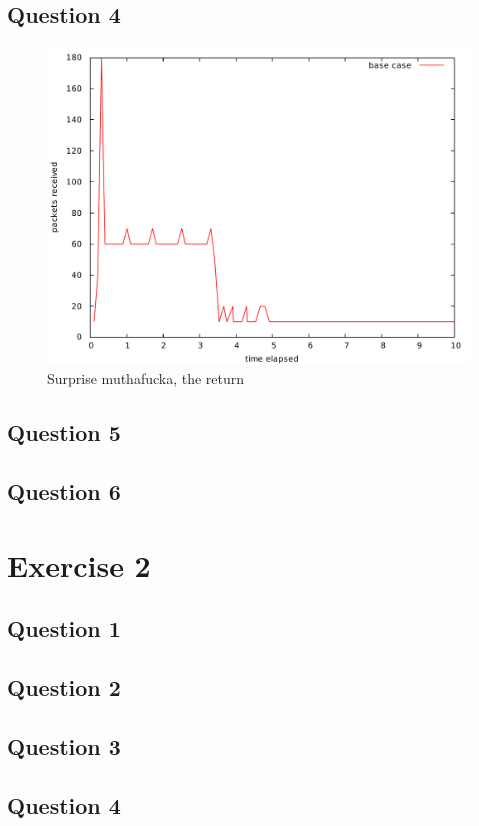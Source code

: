 \documentclass[10pt,a4paper]{article}
\begin{document}
\subsection{Question 4}
\begin{figure}[p]
    \centering
    \includegraphics[width=\textwidth]{../part1/q4/plots/4.pdf}
    \caption{Surprise muthafucka, the return}
    \label{fig:awesome_image_2}
\end{figure}
\subsection{Question 5}
\subsection{Question 6}

\section{Exercise 2}
\subsection{Question 1}
\subsection{Question 2}
\subsection{Question 3}
\subsection{Question 4}
\end{document}
